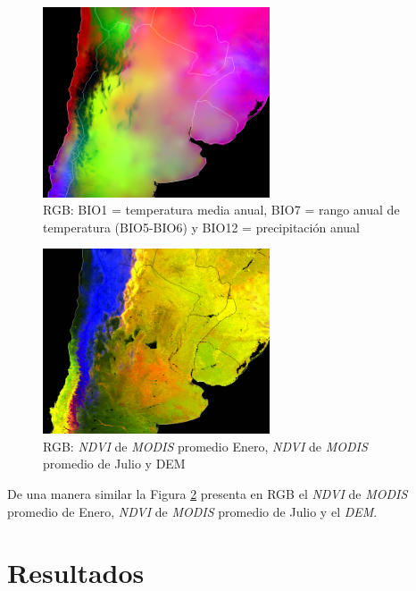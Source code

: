     \begin{figure}[hbt]
      \centering%
      \includegraphics[width=0.6\textwidth]{images/temp_prec}%
      \caption{RGB: BIO1 = temperatura media anual, BIO7 = rango anual de
              temperatura (BIO5-BIO6) y BIO12 = precipitación anual}\label{fig:temp_prec}
    \end{figure}

    \begin{figure}[hbt]
      \centering%
      \includegraphics[width=0.6\textwidth]{images/ndvi_dem}%
      \caption{RGB: \textit{NDVI} de \textit{MODIS} promedio Enero, \textit{NDVI} de
               \textit{MODIS} promedio de Julio y DEM}\label{fig:ndvi_dem}
    \end{figure}

    \par De una manera similar la Figura \ref{fig:ndvi_dem} presenta en RGB el
      \textit{NDVI} de \textit{MODIS} promedio de Enero, \textit{NDVI} de
      \textit{MODIS} promedio de Julio y el \textit{DEM}.

\section{Resultados}

